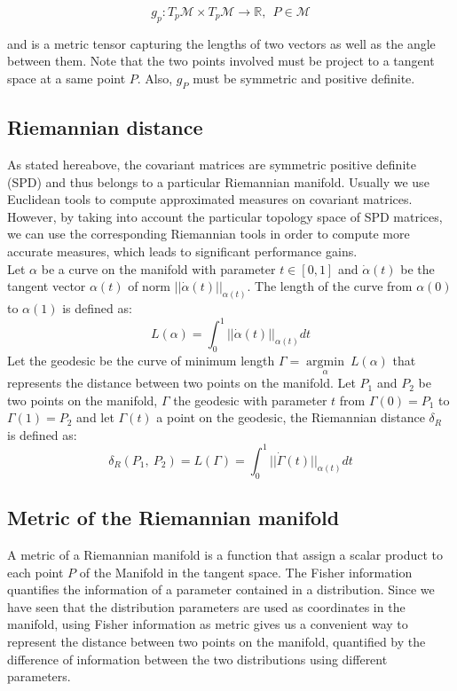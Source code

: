 \documentclass[a4paper,11pt]{report}
\begin{document}
\begin{equation}
    g_p: T_p \mathcal{M} \times T_p \mathcal{M} \rightarrow \mathbb{R}, \ \ P \in \mathcal{M}
\end{equation}

and is a metric tensor capturing the lengths of two vectors as well as the angle between them. Note that the two
points involved must be project to a tangent space at a same point $P$. Also, $g_P$ must be symmetric and positive definite.

\subsection{Riemannian distance}

As stated hereabove, the covariant matrices are symmetric positive definite (SPD) and thus belongs to a particular Riemannian manifold. Usually we use Euclidean tools to compute approximated measures on covariant matrices. However, by taking into account the particular topology space of SPD matrices, we can use the corresponding Riemannian tools in order to compute more accurate measures, which leads to significant performance gains.\\

Let $\alpha$ be a curve on the manifold with parameter $t \in [0, 1]$ and $\dot{\alpha}(t)$ be the tangent vector $\alpha (t)$ of norm $||\dot{\alpha}(t)||_{\alpha (t)}$. The length of the curve from $\alpha (0)$ to $\alpha (1)$ is defined as:
$$L(\alpha) = \int_{0}^{1} ||\dot{\alpha}(t)||_{\alpha (t)} dt$$
Let the geodesic be the curve of minimum length $\Gamma = \mathop{\mathrm{argmin}}\limits_{\alpha}\ L(\alpha)$ that represents the distance between two points on the manifold.
Let $P_1$ and $P_2$ be two points on the manifold, $\Gamma$ the geodesic with parameter $t$ from $\Gamma(0) = P_1$ to $\Gamma(1) = P_2$ and let $\Gamma(t)$ a point on the geodesic, the Riemannian distance $\delta_R$ is defined as:
$$\delta_R (P_1,\ P_2) = L(\Gamma) = \int_{0}^{1} ||\dot{\Gamma}(t)||_{\alpha (t)} dt$$

\subsection{Metric of the Riemannian manifold}
A metric of a Riemannian manifold is a function that assign a scalar product to each point $P$ of the Manifold in the tangent space. 
The Fisher information quantifies the information of a parameter contained in a distribution. Since we have seen that the distribution parameters are used as coordinates in the manifold, using Fisher information as metric gives us a convenient way to represent the distance between two points on the manifold, quantified by the difference of information between the two distributions using different parameters.
\end{document}
